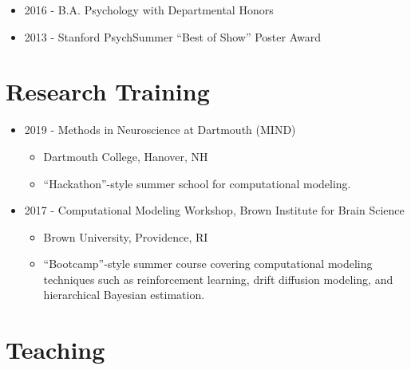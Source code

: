 \documentclass[
]{article}
\providecommand{\tightlist}{%
  \setlength{\itemsep}{0pt}\setlength{\parskip}{0pt}}
\begin{document}
\begin{itemize}
\item
  2016 - B.A. Psychology with Departmental Honors
\item
  2013 - Stanford PsychSummer ``Best of Show'' Poster Award
\end{itemize}

\hypertarget{research-training}{%
\section{Research Training}\label{research-training}}

\begin{itemize}
\item
  2019 - Methods in Neuroscience at Dartmouth (MIND)

  \begin{itemize}
  \tightlist
  \item
    Dartmouth College, Hanover, NH
  \item
    ``Hackathon''-style summer school for computational modeling.
  \end{itemize}
\item
  2017 - Computational Modeling Workshop, Brown Institute for Brain
  Science

  \begin{itemize}
  \tightlist
  \item
    Brown University, Providence, RI
  \item
    ``Bootcamp''-style summer course covering computational modeling
    techniques such as reinforcement learning, drift diffusion modeling,
    and hierarchical Bayesian estimation.
  \end{itemize}
\end{itemize}

\hypertarget{teaching}{%
\section{Teaching}\label{teaching}}
\end{document}
